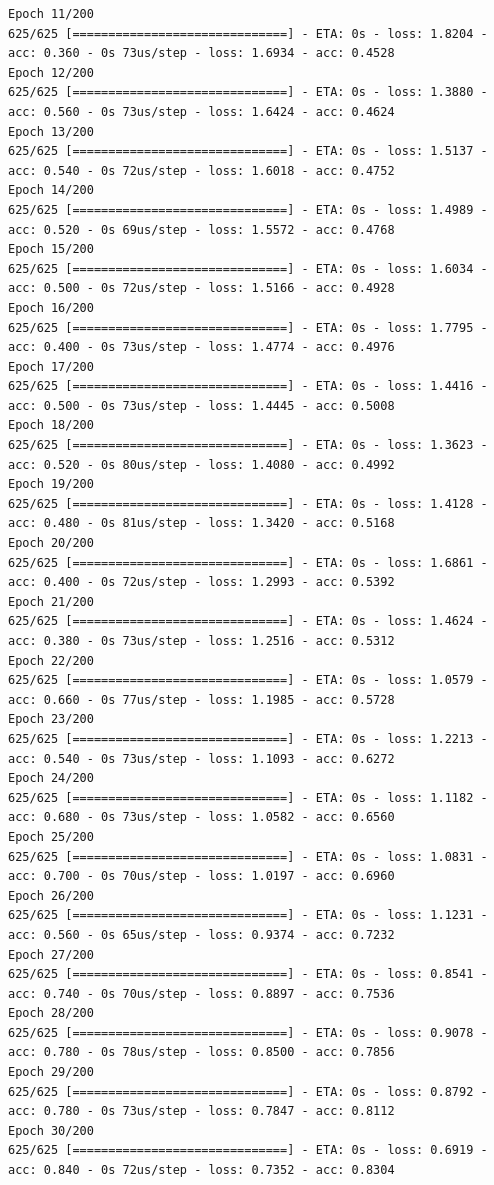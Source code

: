 \documentclass[11pt]{article}
\begin{document}
\begin{Verbatim}[commandchars=\\\{\}]
Epoch 11/200
625/625 [==============================] - ETA: 0s - loss: 1.8204 - acc: 0.360 - 0s 73us/step - loss: 1.6934 - acc: 0.4528
Epoch 12/200
625/625 [==============================] - ETA: 0s - loss: 1.3880 - acc: 0.560 - 0s 73us/step - loss: 1.6424 - acc: 0.4624
Epoch 13/200
625/625 [==============================] - ETA: 0s - loss: 1.5137 - acc: 0.540 - 0s 72us/step - loss: 1.6018 - acc: 0.4752
Epoch 14/200
625/625 [==============================] - ETA: 0s - loss: 1.4989 - acc: 0.520 - 0s 69us/step - loss: 1.5572 - acc: 0.4768
Epoch 15/200
625/625 [==============================] - ETA: 0s - loss: 1.6034 - acc: 0.500 - 0s 72us/step - loss: 1.5166 - acc: 0.4928
Epoch 16/200
625/625 [==============================] - ETA: 0s - loss: 1.7795 - acc: 0.400 - 0s 73us/step - loss: 1.4774 - acc: 0.4976
Epoch 17/200
625/625 [==============================] - ETA: 0s - loss: 1.4416 - acc: 0.500 - 0s 73us/step - loss: 1.4445 - acc: 0.5008
Epoch 18/200
625/625 [==============================] - ETA: 0s - loss: 1.3623 - acc: 0.520 - 0s 80us/step - loss: 1.4080 - acc: 0.4992
Epoch 19/200
625/625 [==============================] - ETA: 0s - loss: 1.4128 - acc: 0.480 - 0s 81us/step - loss: 1.3420 - acc: 0.5168
Epoch 20/200
625/625 [==============================] - ETA: 0s - loss: 1.6861 - acc: 0.400 - 0s 72us/step - loss: 1.2993 - acc: 0.5392
Epoch 21/200
625/625 [==============================] - ETA: 0s - loss: 1.4624 - acc: 0.380 - 0s 73us/step - loss: 1.2516 - acc: 0.5312
Epoch 22/200
625/625 [==============================] - ETA: 0s - loss: 1.0579 - acc: 0.660 - 0s 77us/step - loss: 1.1985 - acc: 0.5728
Epoch 23/200
625/625 [==============================] - ETA: 0s - loss: 1.2213 - acc: 0.540 - 0s 73us/step - loss: 1.1093 - acc: 0.6272
Epoch 24/200
625/625 [==============================] - ETA: 0s - loss: 1.1182 - acc: 0.680 - 0s 73us/step - loss: 1.0582 - acc: 0.6560
Epoch 25/200
625/625 [==============================] - ETA: 0s - loss: 1.0831 - acc: 0.700 - 0s 70us/step - loss: 1.0197 - acc: 0.6960
Epoch 26/200
625/625 [==============================] - ETA: 0s - loss: 1.1231 - acc: 0.560 - 0s 65us/step - loss: 0.9374 - acc: 0.7232
Epoch 27/200
625/625 [==============================] - ETA: 0s - loss: 0.8541 - acc: 0.740 - 0s 70us/step - loss: 0.8897 - acc: 0.7536
Epoch 28/200
625/625 [==============================] - ETA: 0s - loss: 0.9078 - acc: 0.780 - 0s 78us/step - loss: 0.8500 - acc: 0.7856
Epoch 29/200
625/625 [==============================] - ETA: 0s - loss: 0.8792 - acc: 0.780 - 0s 73us/step - loss: 0.7847 - acc: 0.8112
Epoch 30/200
625/625 [==============================] - ETA: 0s - loss: 0.6919 - acc: 0.840 - 0s 72us/step - loss: 0.7352 - acc: 0.8304

\end{Verbatim}
\end{document}
